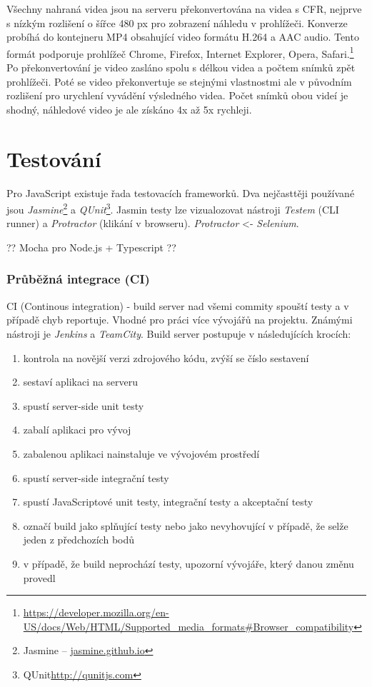 Všechny nahraná videa jsou na serveru překonvertována na videa s CFR, nejprve s nízkým rozlišení o šířce 480 px pro zobrazení náhledu v prohlížeči. Konverze probíhá do kontejneru MP4 obsahující video formátu H.264 a AAC audio. Tento formát podporuje prohlížeč Chrome, Firefox, Internet Explorer, Opera, Safari.\footnote{\url{https://developer.mozilla.org/en-US/docs/Web/HTML/Supported_media_formats#Browser_compatibility}} Po překonvertování je video zasláno spolu s délkou videa a počtem snímků zpět prohlížeči. Poté se video překonvertuje se stejnými vlastnostmi ale v původním rozlišení pro urychlení vyvádění výsledného videa. Počet snímků obou videí je shodný, náhledové video je ale získáno 4x až 5x rychleji.

\chapter{Testování}
Pro JavaScript existuje řada testovacích frameworků. Dva nejčasttěji používané jsou \textit{Jasmine}\footnote{Jasmine -- \url{jasmine.github.io}} a \textit{QUnit}\footnote{QUnit\url{http://qunitjs.com}}. Jasmin testy lze vizualozovat nástroji \textit{Testem} (CLI runner) a \textit{Protractor} (klikání v browseru). \textit{Protractor} <- \textit{Selenium}.

?? Mocha pro Node.js + Typescript ??

\subsection{Průběžná integrace (CI)}
CI (Continous integration) - build server nad všemi commity spouští testy a v případě chyb reportuje. Vhodné pro práci více vývojářů na projektu. Známými nástroji je \textit{Jenkins} a \textit{TeamCity}. Build server postupuje v následujících krocích:
\begin{enumerate}
\item kontrola na novější verzi zdrojového kódu, zvýší se číslo sestavení
\item sestaví aplikaci na serveru
\item spustí server-side unit testy
\item zabalí aplikaci pro vývoj
\item zabalenou aplikaci nainstaluje ve vývojovém prostředí
\item spustí server-side integrační testy
\item spustí JavaScriptové unit testy, integrační testy a akceptační testy
\item označí build jako splňující testy nebo jako nevyhovující v případě, že selže jeden z předchozích bodů
\item v případě, že build neprochází testy, upozorní vývojáře, který danou změnu provedl
\end{enumerate}

